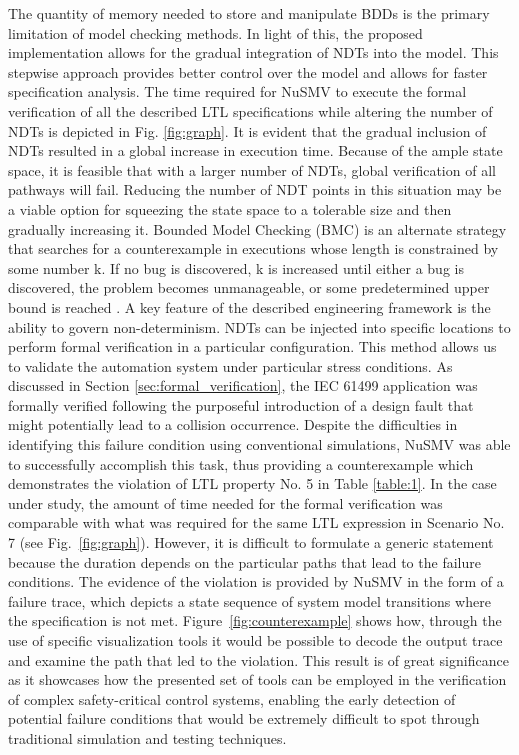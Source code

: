 \documentclass{ieeeojies}
\begin{document}
The quantity of memory needed to store and manipulate BDDs is the primary limitation of model checking methods. In light of this, the proposed implementation allows for the gradual integration of NDTs into the model. This stepwise approach provides better control over the model and allows for faster specification analysis. The time required for NuSMV to execute the formal verification of all the described LTL specifications while altering the number of NDTs is depicted in Fig. \ref{fig:graph}. It is evident that the gradual inclusion of NDTs resulted in a global increase in execution time.
Because of the ample state space, it is feasible that with a larger number of NDTs, global verification of all pathways will fail.
Reducing the number of NDT points in this situation may be a viable option for squeezing the state space to a tolerable size and then gradually increasing it.
Bounded Model Checking (BMC) is an alternate strategy that searches for a counterexample in executions whose length is constrained by some number k. If no bug is discovered, k is increased until either a bug is discovered, the problem becomes unmanageable, or some predetermined upper bound is reached \cite{Biere2003}.
A key feature of the described engineering framework is the ability to govern non-determinism. NDTs can be injected into specific locations to perform formal verification in a particular configuration. This method allows us to validate the automation system under particular stress conditions.
As discussed in Section \ref{sec:formal_verification}, the IEC 61499 application was formally verified following the purposeful introduction of a design fault that might potentially lead to a collision occurrence.
Despite the difficulties in identifying this failure condition using conventional simulations, NuSMV was able to successfully accomplish this task, thus providing a counterexample which demonstrates the violation of LTL property No. 5 in Table \ref{table:1}.
In the case under study, the amount of time needed for the formal verification was comparable with what was required for the same LTL expression in Scenario No. 7 (see \mbox{Fig. \ref{fig:graph}}). However, it is difficult to formulate a generic statement because the duration depends on the particular paths that lead to the failure conditions. 
The evidence of the violation is provided by NuSMV in the form of a failure trace, which depicts a state sequence of system model transitions where the specification is not met. \mbox{Figure \ref{fig:counterexample}} shows how, through the use of specific visualization tools \cite{pakonen2018} it would be possible to decode the output trace and examine the path that led to the violation. 
This result is of great significance as it showcases how the presented set of tools can be employed in the verification of complex safety-critical control systems, enabling the early detection of potential failure conditions that would be extremely difficult to spot through traditional simulation and testing techniques. 
\end{document}
